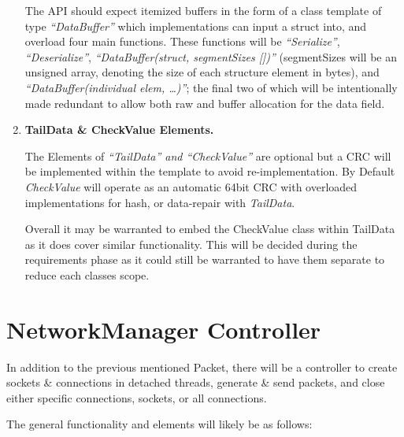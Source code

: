 \documentclass{article}
\begin{document}
\begin{enumerate}
	      The API should expect itemized buffers in the form of a class template of type \textit{``DataBuffer''} which implementations can input a struct into, and overload four main functions. These functions will be \textit{``Serialize''}, \textit{``Deserialize''}, \textit{``DataBuffer(struct, segmentSizes [])''} (segmentSizes will be an unsigned array, denoting the size of each structure element in bytes), and \textit{``DataBuffer(individual elem, \dots)''}; the final two of which will be intentionally made redundant to allow both raw and buffer allocation for the data field.

	\item \textbf{TailData \& CheckValue Elements.}

	      The Elements of \textit{``TailData'' and ``CheckValue''} are optional but a CRC will be implemented within the template to avoid re-implementation. By Default \textit{CheckValue} will operate as an automatic 64bit CRC with overloaded implementations  for hash, or data-repair with \textit{TailData}.

	      Overall it may be warranted to embed the CheckValue class within TailData as it does cover similar functionality. This will be decided during the requirements phase as it could still be warranted to have them separate to reduce each classes scope.

\end{enumerate}

\section{NetworkManager Controller}

In addition to the previous mentioned Packet, there will be a controller to create sockets \& connections in detached threads, generate \& send packets, and close either specific connections, sockets, or all connections.

The general functionality and elements will likely be as follows:
\end{document}
